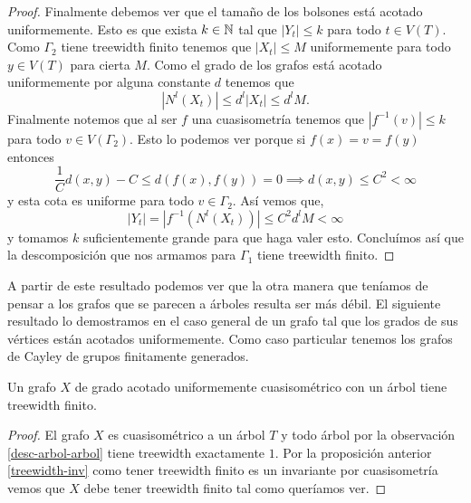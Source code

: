 \documentclass[tesis.tex]{subfiles}
\begin{document}
\begin{proof}
	Finalmente debemos ver que el tamaño de los bolsones está acotado uniformemente.
	Esto es que exista $k \in \mathbb{N}$ tal que $|Y_t| \le k$ para todo $t \in V(T)$.
	Como $\Gamma_2$ tiene treewidth finito tenemos que $|X_t| \le M$ uniformemente para todo $y \in V(T)$ para cierta $M$. 
	Como el grado de los grafos está acotado uniformemente por alguna constante $d$ tenemos que 
	\[
	|N^l(X_t)| \le d^l |X_t| \le d^l M.
	\]
	Finalmente notemos que al ser $f$ una cuasisometría tenemos que $|f^{-1}(v)| \le k$ para todo $v \in V(\Gamma_2)$.
	Esto lo podemos ver porque si $f(x) = v = f(y)$ entonces
	\[
	\frac{1}{C}d(x,y) - C \le d( f(x), f(y) ) = 0 \implies d(x,y) \le C^2 < \infty
	\]
	y esta cota es uniforme para todo $v \in \Gamma_2$. 
	Así vemos que,
	\[
	|Y_t| = |f^{-1}(N^l(X_t))| \le C^2 d^l M < \infty
	\]
	y tomamos $k$ suficientemente grande para que haga valer esto.
	Concluímos así que la descomposición que nos armamos para $\Gamma_1$ tiene treewidth finito.
\end{proof}

A partir de este resultado podemos ver que la otra manera que teníamos de pensar a los grafos que se parecen a árboles resulta ser más débil. 
El siguiente resultado lo demostramos en el caso general de un grafo tal que los grados de sus vértices están acotados uniformemente. 
Como caso particular tenemos los grafos de Cayley de grupos finitamente generados.


\begin{prop} 
	Un grafo $X$ de grado acotado uniformemente cuasisométrico con un árbol tiene treewidth finito.
\end{prop}
\begin{proof}	
	El grafo $X$ es cuasisométrico a un árbol $T$ y todo árbol por la observación \ref{desc-arbol-arbol} tiene treewidth exactamente $1$.
	Por la proposición anterior \ref{treewidth-inv} como tener treewidth finito es un invariante por cuasisometría vemos que $X$ debe tener treewidth finito tal como queríamos ver.
\end{proof}
\end{document}
